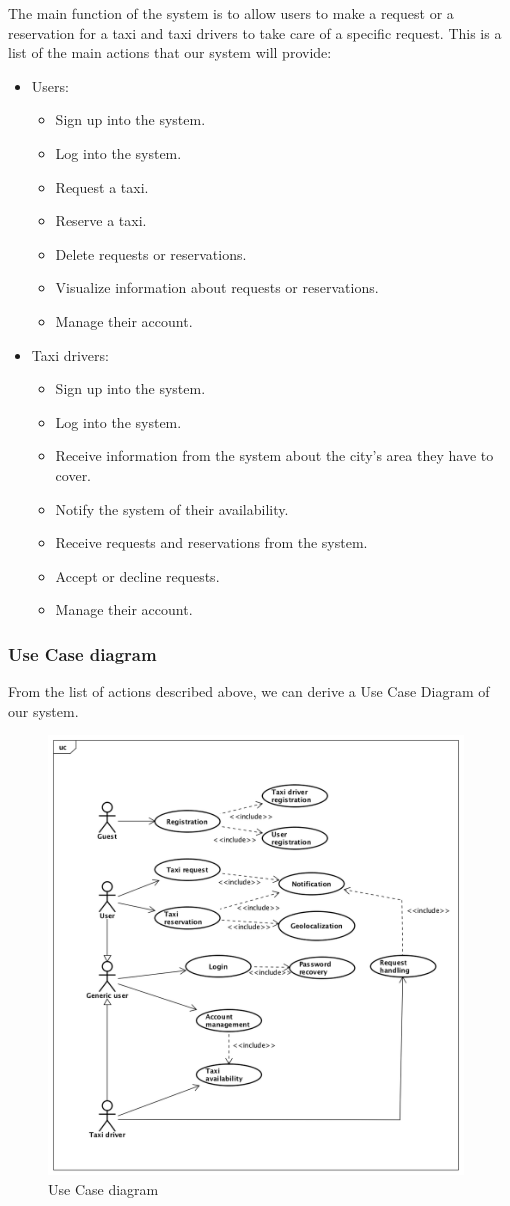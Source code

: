 The main function of the system is to allow users to make a request or a reservation for a taxi and taxi drivers to take care of a specific request.
This is a list of the main actions that our system will provide:

\begin{itemize}
    \item Users:
        \begin{itemize}
        	\item Sign up into the system.
        	\item Log into the system.
        	\item Request a taxi.
        	\item Reserve a taxi.
        	\item Delete requests or reservations.
        	\item Visualize information about requests or reservations.
        	\item Manage their account.
        \end{itemize}
    \item Taxi drivers:
        \begin{itemize}
        	\item Sign up into the system.
        	\item Log into the system.
        	\item Receive information from the system about the city's area they have to cover.
        	\item Notify the system of their availability.
        	\item Receive requests and reservations from the system.
        	\item Accept or decline requests.
        	\item Manage their account.
        \end{itemize}
\end{itemize}

\newpage
\subsubsection{Use Case diagram}
From the list of actions described above, we can derive a Use Case Diagram of our system.

\begin{figure}[h]
    \includegraphics[width=11cm]{./Diagrams/UseCaseDiagram.png}
    \caption{Use Case diagram}
    \centering
\end{figure}

